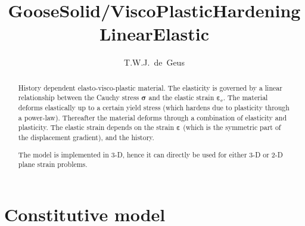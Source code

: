\documentclass[times,namecite]{goose-article}
\title{%
  GooseSolid/ViscoPlasticHardeningLinearElastic
}
\author{T.W.J.~de~Geus}
\begin{document}
\maketitle

\begin{abstract}
History dependent elasto-visco-plastic material. The elasticity is governed by a linear relationship between the Cauchy stress $\bm{\sigma}$ and the elastic strain $\bm{\varepsilon}_\mathrm{e}$. The material deforms elastically up to a certain yield stress (which hardens due to plasticity through a power-law). Thereafter the material deforms through a combination of elasticity and plasticity. The elastic strain depends on the strain $\bm{\varepsilon}$ (which is the symmetric part of the displacement gradient), and the history.

The model is implemented in 3-D, hence it can directly be used for either 3-D or 2-D plane strain problems.
\end{abstract}


\setcounter{tocdepth}{2}
\tableofcontents

\vfill\newpage
\section{Constitutive model}
\end{document}

